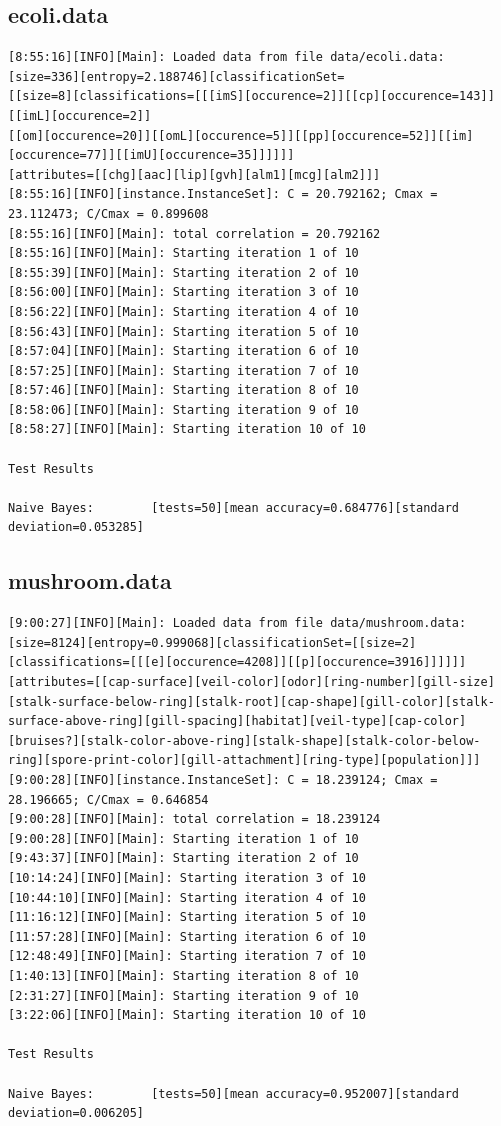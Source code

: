 \documentclass[10pt]{report}
\begin{document}
\subsection*{ecoli.data}
{\small
\begin{verbatim}
[8:55:16][INFO][Main]: Loaded data from file data/ecoli.data:
[size=336][entropy=2.188746][classificationSet=
[[size=8][classifications=[[[imS][occurence=2]][[cp][occurence=143]][[imL][occurence=2]]
[[om][occurence=20]][[omL][occurence=5]][[pp][occurence=52]][[im][occurence=77]][[imU][occurence=35]]]]]]
[attributes=[[chg][aac][lip][gvh][alm1][mcg][alm2]]] 
[8:55:16][INFO][instance.InstanceSet]: C = 20.792162; Cmax = 23.112473; C/Cmax = 0.899608 
[8:55:16][INFO][Main]: total correlation = 20.792162 
[8:55:16][INFO][Main]: Starting iteration 1 of 10 
[8:55:39][INFO][Main]: Starting iteration 2 of 10 
[8:56:00][INFO][Main]: Starting iteration 3 of 10 
[8:56:22][INFO][Main]: Starting iteration 4 of 10 
[8:56:43][INFO][Main]: Starting iteration 5 of 10 
[8:57:04][INFO][Main]: Starting iteration 6 of 10 
[8:57:25][INFO][Main]: Starting iteration 7 of 10 
[8:57:46][INFO][Main]: Starting iteration 8 of 10 
[8:58:06][INFO][Main]: Starting iteration 9 of 10 
[8:58:27][INFO][Main]: Starting iteration 10 of 10 

Test Results

Naive Bayes:		[tests=50][mean accuracy=0.684776][standard deviation=0.053285] 
\end{verbatim}
}


\subsection*{mushroom.data}
{\small
\begin{verbatim}
[9:00:27][INFO][Main]: Loaded data from file data/mushroom.data: [size=8124][entropy=0.999068][classificationSet=[[size=2][classifications=[[[e][occurence=4208]][[p][occurence=3916]]]]]][attributes=[[cap-surface][veil-color][odor][ring-number][gill-size][stalk-surface-below-ring][stalk-root][cap-shape][gill-color][stalk-surface-above-ring][gill-spacing][habitat][veil-type][cap-color][bruises?][stalk-color-above-ring][stalk-shape][stalk-color-below-ring][spore-print-color][gill-attachment][ring-type][population]]] 
[9:00:28][INFO][instance.InstanceSet]: C = 18.239124; Cmax = 28.196665; C/Cmax = 0.646854 
[9:00:28][INFO][Main]: total correlation = 18.239124 
[9:00:28][INFO][Main]: Starting iteration 1 of 10 
[9:43:37][INFO][Main]: Starting iteration 2 of 10 
[10:14:24][INFO][Main]: Starting iteration 3 of 10 
[10:44:10][INFO][Main]: Starting iteration 4 of 10 
[11:16:12][INFO][Main]: Starting iteration 5 of 10 
[11:57:28][INFO][Main]: Starting iteration 6 of 10 
[12:48:49][INFO][Main]: Starting iteration 7 of 10 
[1:40:13][INFO][Main]: Starting iteration 8 of 10 
[2:31:27][INFO][Main]: Starting iteration 9 of 10 
[3:22:06][INFO][Main]: Starting iteration 10 of 10 

Test Results

Naive Bayes:		[tests=50][mean accuracy=0.952007][standard deviation=0.006205] 
\end{verbatim}
}
\end{document}
